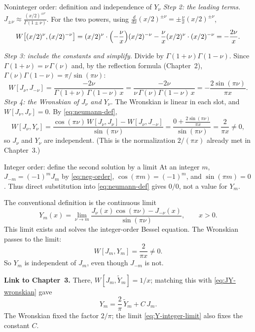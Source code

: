 \documentclass[11pt]{beamer}
\begin{document}
\begin{frame}[allowframebreaks=1.00]{Noninteger order: definition and independence of $Y_\nu$}
\emph{Step 2: the leading terms.} \(J_{\pm\nu}\approx\frac{(x/2)^{\pm\nu}}{\Gamma(1\pm\nu)}\). For the two powers,
using \(\frac{d}{dx}(x/2)^{\pm\nu}=\pm\frac\nu x(x/2)^{\pm\nu}\),
\[
 W\bigl[(x/2)^{\nu},(x/2)^{-\nu}\bigr]
 =(x/2)^\nu\cdot\Bigl(-\frac\nu x\Bigr)(x/2)^{-\nu}-\frac\nu x(x/2)^\nu\cdot(x/2)^{-\nu}
 =-\frac{2\nu}{x}.
\]
\par\framebreak\par
\emph{Step 3: include the constants and simplify.} Divide by \(\Gamma(1+\nu)\Gamma(1-\nu)\). Since
\(\Gamma(1+\nu)=\nu\,\Gamma(\nu)\) and, by the reflection formula (Chapter~2),
\(\Gamma(\nu)\Gamma(1-\nu)=\pi/\sin(\pi\nu)\):
\[
 W[J_\nu,J_{-\nu}]=\frac{-2\nu}{\Gamma(1+\nu)\,\Gamma(1-\nu)\,x}
 =\frac{-2\nu}{\nu\,\Gamma(\nu)\Gamma(1-\nu)\,x}
 =-\frac{2\sin(\pi\nu)}{\pi x}.
\]
\emph{Step 4: the Wronskian of \(J_\nu\) and \(Y_\nu\).} The Wronskian is linear in each slot, and
\(W[J_\nu,J_\nu]=0\). By \eqref{eq:neumann-def},
\[
 W[J_\nu,Y_\nu]=\frac{\cos(\pi\nu)\,W[J_\nu,J_\nu]-W[J_\nu,J_{-\nu}]}{\sin(\pi\nu)}
 =\frac{0+\frac{2\sin(\pi\nu)}{\pi x}}{\sin(\pi\nu)}=\frac{2}{\pi x}\ne0,
\]
so \(J_\nu\) and \(Y_\nu\) are independent. (This is the normalization \(2/(\pi x)\) already met in Chapter~3.)
\end{frame}

\begin{frame}[allowframebreaks=1.00]{Integer order: define the second solution by a limit}
\footnotesize
At an integer $m$, $J_{-m}=(-1)^mJ_m$ by \eqref{eq:neg-order}, $\cos(\pi m)=(-1)^m$, and
$\sin(\pi m)=0$. Thus direct substitution into \eqref{eq:neumann-def} gives $0/0$,
not a value for $Y_m$.

The conventional definition is the continuous limit
\begin{equation}
 Y_m(x)=\lim_{\nu\to m}
 \frac{J_\nu(x)\cos(\pi\nu)-J_{-\nu}(x)}{\sin(\pi\nu)},\qquad x>0.
 \label{eq:Y-integer-limit}
\end{equation}
This limit exists and solves the integer-order Bessel equation.
The Wronskian passes to the limit:
\begin{equation}
 W[J_m,Y_m]=\frac2{\pi x}\ne0.
 \label{eq:JY-wronskian}
\end{equation}
So $Y_m$ is independent of $J_m$, even though $J_{-m}$ is not.

\textbf{Link to Chapter~3.} There, $W[J_m,\widetilde Y_m]=1/x$; matching this with
\eqref{eq:JY-wronskian} gave
\begin{equation}
 Y_m=\frac2\pi\,\widetilde Y_m+C\,J_m .
 \label{eq:Y-from-Ytilde}
\end{equation}
The Wronskian fixed the factor $2/\pi$; the limit \eqref{eq:Y-integer-limit} also fixes the constant $C$.
\end{frame}
\end{document}
